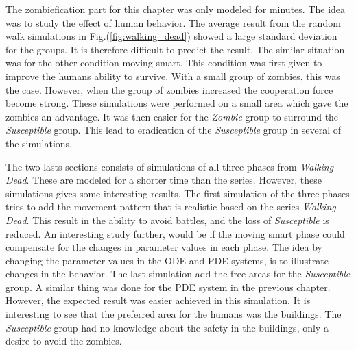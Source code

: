 \documentclass[%
twoside,                 %
final,                   %
chapterprefix=true,      %
open=right               %
10pt]{book}
\newcommand{\clearemptydoublepage}{\clearpage{\pagestyle{empty}\cleardoublepage}}
\begin{document}
\vspace{3mm}




\vspace{3mm}


The zombiefication part for this chapter was only modeled for minutes. The idea was to study the effect of human behavior. The average result from the random walk simulations in Fig.(\ref{fig:walking_dead}) showed a large standard deviation for the groups. It is therefore difficult to predict the result. The similar situation was for the other condition moving smart. This condition was first given to improve the humans ability to survive. With a small group of zombies, this was the case. However, when the group of zombies increased the cooperation force become strong. These simulations were performed on a small area which gave the zombies an advantage. It was then easier for the \emph{Zombie} group to surround the \emph{Susceptible} group. This lead to eradication of the \emph{Susceptible} group in several of the simulations.


\vspace{3mm}




\vspace{3mm}


The two lasts sections consists of simulations of all three phases from \emph{Walking Dead}. These are modeled for a shorter time than the series. However, these simulations gives some interesting results. The first simulation of the three phases tries to add the movement pattern that is realistic based on the series \emph{Walking Dead}. This result in the ability to avoid battles, and the loss of \emph{Susceptible} is reduced. An interesting study further, would be if the moving smart phase could compensate for the changes in parameter values in each phase. The idea by changing the parameter values in the ODE and PDE systems, is to illustrate changes in the behavior. The last simulation add the free areas for the \emph{Susceptible} group. A similar thing was done for the PDE system in the previous chapter. However, the expected result was easier achieved in this simulation. It is interesting to see that the preferred area for the humans was the buildings. The \emph{Susceptible} group had no knowledge about the safety in the buildings, only a desire to avoid the zombies. 



\clearemptydoublepage
{}
\thispagestyle{empty}








\clearemptydoublepage
{}
\thispagestyle{empty}
\printindex
\end{document}
